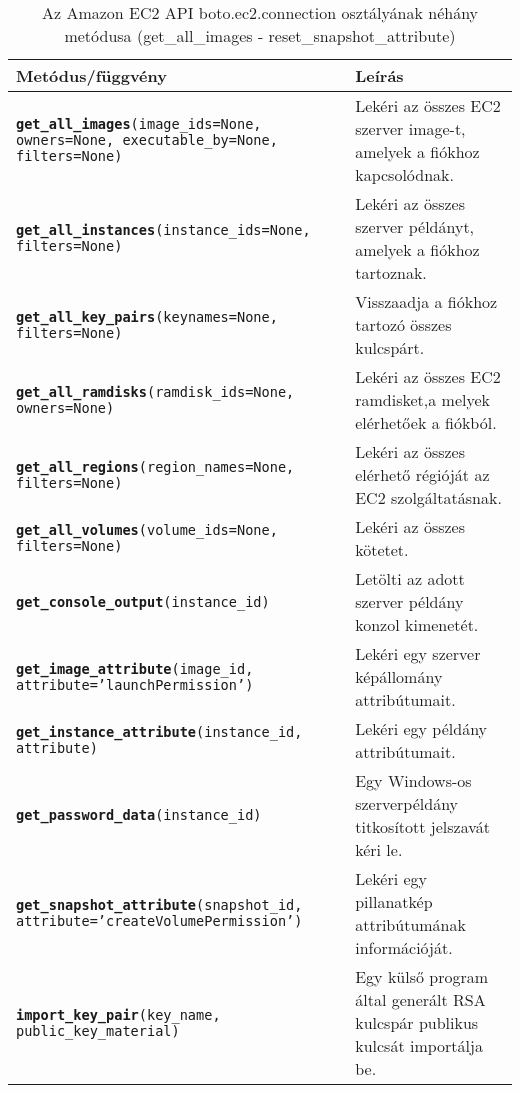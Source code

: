 \begin{table}[h]
	\caption{Az Amazon EC2 API boto.ec2.connection osztályának néhány metódusa (get\_all\_images - reset\_snapshot\_attribute)}
	\centering
	\small
	\begin{tabular}{| p{8.0cm} | p{6.0cm} |}
	\hline
		\rowcolor{MyTableColor} \textbf{Metódus/függvény} & \textbf{Leírás} \\
	    \hline          
        \texttt{\textbf{get\_all\_images}(image\_ids=None, owners=None, executable\_by=None, filters=None)} & Lekéri az összes EC2 szerver image-t, amelyek a fiókhoz kapcsolódnak. \\
        \hline   
        \texttt{\textbf{get\_all\_instances}(instance\_ids=None, filters=None)} & Lekéri az összes szerver példányt, amelyek a fiókhoz tartoznak. \\
        \hline
        \texttt{\textbf{get\_all\_key\_pairs}(keynames=None, filters=None)} & Visszaadja a fiókhoz tartozó összes kulcspárt. \\
        \hline
        \texttt{\textbf{get\_all\_ramdisks}(ramdisk\_ids=None, owners=None)} & Lekéri az összes EC2 ramdisket,a melyek elérhetőek a fiókból. \\
        \hline
        \texttt{\textbf{get\_all\_regions}(region\_names=None, filters=None)} & Lekéri az összes elérhető régióját az EC2 szolgáltatásnak. \\
        \hline
        \texttt{\textbf{get\_all\_volumes}(volume\_ids=None, filters=None)} & Lekéri az összes kötetet. \\
        \hline
        \texttt{\textbf{get\_console\_output}(instance\_id)} & Letölti az adott szerver példány konzol kimenetét. \\
        \hline
        \texttt{\textbf{get\_image\_attribute}(image\_id, attribute='launchPermission')} & Lekéri egy szerver képállomány attribútumait. \\
        \hline
        \texttt{\textbf{get\_instance\_attribute}(instance\_id, attribute)} & Lekéri egy példány attribútumait. \\
        \hline
        \texttt{\textbf{get\_password\_data}(instance\_id)} & Egy Windows-os szerverpéldány titkosított jelszavát kéri le. \\
        \hline
        \texttt{\textbf{get\_snapshot\_attribute}(snapshot\_id, attribute='createVolumePermission')} & Lekéri egy pillanatkép attribútumának információját. \\
        \hline
        \texttt{\textbf{import\_key\_pair}(key\_name, public\_key\_material)} & Egy külső program által generált RSA kulcspár publikus kulcsát importálja be. \\

\end{tabular}
\end{table}
